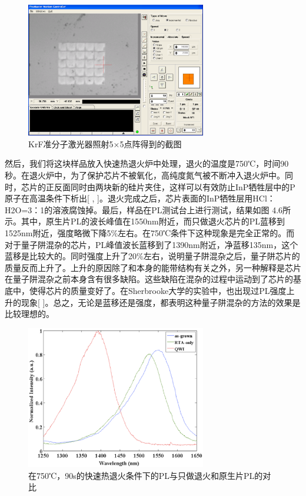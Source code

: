 \documentclass{ZJUthesis}
\begin{document}
\begin{figure}[!t]
    \centering
    \includegraphics[width=0.7\textwidth]{./Pictures/spots.eps}
    \caption{KrF准分子激光器照射5×5点阵得到的截图}
    \label{fig_spots}
\end{figure}

然后，我们将这块样品放入快速热退火炉中处理，退火的温度是750℃，时间90秒。在退火炉中，为了保护芯片不被氧化，高纯度氮气被不断冲入退火炉中。同时，芯片的正反面同时由两块新的硅片夹住，这样可以有效防止InP牺牲层中的P原子在高温条件下析出[ , ]。退火完成之后，芯片表面的InP牺牲层用HCl：H2O=3：1的溶液腐蚀掉。最后，样品在PL测试台上进行测试，结果如图 4.6所示。其中，原生片PL的波长峰值在1550nm附近，而只做退火芯片的PL蓝移到1525nm附近，强度略微下降5\%左右。在750℃条件下这种现象是完全正常的。而对于量子阱混杂的芯片，PL峰值波长蓝移到了1390nm附近，净蓝移135nm，这个蓝移是比较大的。同时强度上升了20\%左右，说明量子阱混杂之后，量子阱芯片的质量反而上升了。上升的原因除了和本身的能带结构有关之外，另一种解释是芯片在量子阱混杂之前本身含有很多缺陷。这些缺陷在混杂的过程中运动到了芯片的基底中，使得芯片的质量变好了。在Sherbrooke大学的实验中，也出现过PL强度上升的现象[ ]。总之，无论是蓝移还是强度，都表明这种量子阱混杂的方法的效果是比较理想的。

\begin{figure}[!t]
    \centering
    \includegraphics[width=0.7\textwidth]{./Pictures/uv_result.eps}
    \caption{在750℃，90s的快速热退火条件下的PL与只做退火和原生片PL的对比}
    \label{fig_uv_result}
\end{figure}
\end{document}
